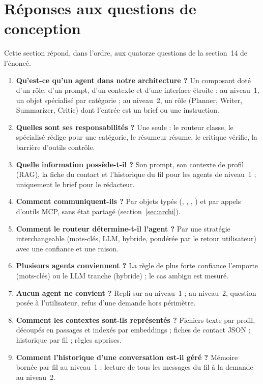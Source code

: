 \section{Réponses aux questions de conception}
\label{sec:questions}

Cette section répond, dans l'ordre, aux quatorze questions de la section~14 de l'énoncé.

\begin{enumerate}
  \item \textbf{Qu'est-ce qu'un agent dans notre architecture ?} Un composant doté d'un rôle, d'un prompt, d'un contexte et d'une interface étroite : au niveau~1, un objet  spécialisé par catégorie ; au niveau~2, un rôle (Planner, Writer, Summarizer, Critic) dont l'entrée est un brief ou une instruction.
  \item \textbf{Quelles sont ses responsabilités ?} Une seule : le routeur classe, le spécialisé rédige pour une catégorie, le résumeur résume, le critique vérifie, la barrière d'outils contrôle.
  \item \textbf{Quelle information possède-t-il ?} Son prompt, son contexte de profil (RAG), la fiche du contact et l'historique du fil pour les agents de niveau~1 ; uniquement le brief pour le rédacteur.
  \item \textbf{Comment communiquent-ils ?} Par objets typés (, , , ) et par appels d'outils MCP, sans état partagé (section~\ref{sec:archi}).
  \item \textbf{Comment le routeur détermine-t-il l'agent ?} Par une stratégie interchangeable (mots-clés, LLM, hybride, pondérée par le retour utilisateur) avec une confiance et une raison.
  \item \textbf{Plusieurs agents conviennent ?} La règle de plus forte confiance l'emporte (mots-clés) ou le LLM tranche (hybride) ; le cas ambigu est mesuré.
  \item \textbf{Aucun agent ne convient ?} Repli sur  au niveau~1 ; au niveau~2, question posée à l'utilisateur, refus d'une demande hors périmètre.
  \item \textbf{Comment les contextes sont-ils représentés ?} Fichiers texte par profil, découpés en passages et indexés par embeddings ; fiches de contact JSON ; historique par fil ; règles apprises.
  \item \textbf{Comment l'historique d'une conversation est-il géré ?} Mémoire bornée par fil au niveau~1 ; lecture de tous les messages du fil à la demande au niveau~2.

\end{enumerate}
